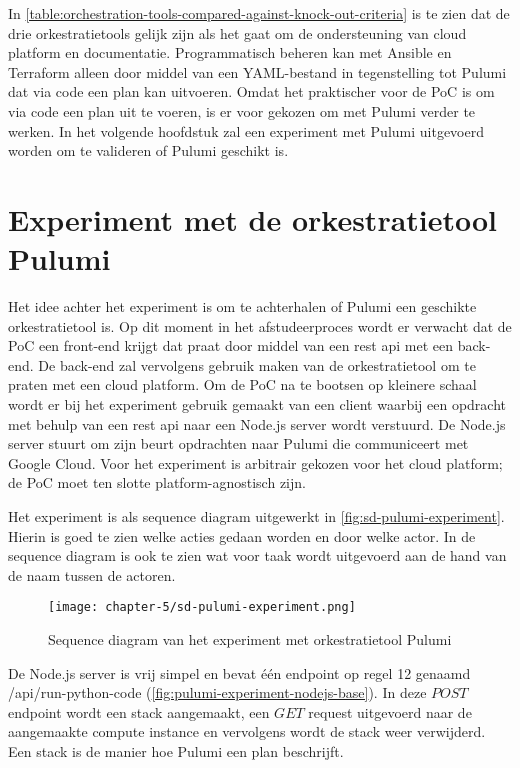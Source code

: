 In \autoref{table:orchestration-tools-compared-against-knock-out-criteria} is te zien dat de drie orkestratietools gelijk zijn als het gaat om de ondersteuning van cloud platform en documentatie. Programmatisch beheren kan met Ansible en Terraform alleen door middel van een YAML-bestand in tegenstelling tot Pulumi dat via code een plan kan uitvoeren. Omdat het praktischer voor de PoC is om via code een plan uit te voeren, is er voor gekozen om met Pulumi verder te werken. In het volgende hoofdstuk zal een experiment met Pulumi uitgevoerd worden om te valideren of Pulumi geschikt is.

\section{Experiment met de orkestratietool Pulumi}\label{subsec:ch5-experiment-met-de-orkestratietool-pulumi}
Het idee achter het experiment is om te achterhalen of Pulumi een geschikte orkestratietool is. Op dit moment in het afstudeerproces wordt er verwacht dat de PoC een front-end krijgt dat praat door middel van een \acrfull{rest} \Acrshort{api} met een back-end. De back-end zal vervolgens gebruik maken van de orkestratietool om te praten met een cloud platform. Om de PoC na te bootsen op kleinere schaal wordt er bij het experiment gebruik gemaakt van een client waarbij een opdracht met behulp van een \Acrshort{rest} \Acrshort{api} naar een Node.js server wordt verstuurd. De Node.js server stuurt om zijn beurt opdrachten naar Pulumi die communiceert met Google Cloud. Voor het experiment is arbitrair gekozen voor het cloud platform; de PoC moet ten slotte platform-agnostisch zijn.

Het experiment is als sequence diagram uitgewerkt in \autoref{fig:sd-pulumi-experiment}. Hierin is goed te zien welke acties gedaan worden en door welke actor. In de sequence diagram is ook te zien wat voor taak wordt uitgevoerd aan de hand van de naam tussen de actoren.

\begin{figure}[hbt!]
  \centering
  \texttt{[image: chapter-5/sd-pulumi-experiment.png]}
  \caption{Sequence diagram van het experiment met orkestratietool Pulumi}
  \label{fig:sd-pulumi-experiment}
\end{figure}

\newpage

De Node.js server is vrij simpel en bevat één endpoint op regel 12 genaamd /api/run-python-code (\autoref{fig:pulumi-experiment-nodejs-base}). In deze \(POST\) endpoint wordt een stack aangemaakt, een \(GET\) request uitgevoerd naar de aangemaakte compute instance en vervolgens wordt de stack weer verwijderd. Een stack is de manier hoe Pulumi een plan beschrijft.

